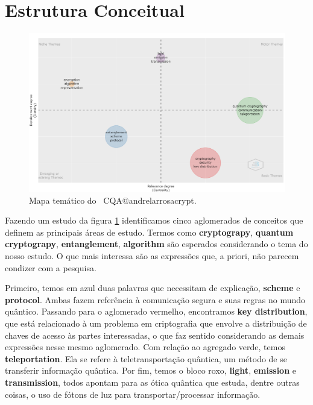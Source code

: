 \section{Estrutura Conceitual}

\begin{figure}
    \centering
    \includegraphics[angle=0,width=1\textwidth]{experiments/andrelarrosacrypt/AnaliseBibliometrica/CriptografiaQuantica/imagens/CQA@andrelarrosacrypt_MapaTematico.png}
    \caption{Mapa temático do \dataset\ CQA@andrelarrosacrypt.}
    \label{CQA@andrelarrosacrypt_MapaTematico}
\end{figure}

Fazendo um estudo da figura \ref{CQA@andrelarrosacrypt_MapaTematico} identificamos cinco aglomerados de conceitos que definem as principais áreas de estudo. Termos como \textbf{cryptograpy}, \textbf{quantum cryptograpy}, \textbf{entanglement}, \textbf{algorithm}  são esperados considerando o tema do nosso estudo. O que mais interessa são as expressões que, a priori, não parecem condizer com a pesquisa.

Primeiro, temos em azul duas palavras que necessitam de explicação, \textbf{scheme} e \textbf{protocol}. Ambas fazem referência à comunicação segura e suas regras no mundo quântico. Passando para o aglomerado vermelho, encontramos \textbf{key distribution}, que está relacionado à um problema em criptografia que envolve a distribuição de chaves de acesso às partes interessadas, o que faz sentido considerando as demais expressões nesse mesmo aglomerado. Com relação ao agregado verde, temos \textbf{teleportation}. Ela se refere à teletransportação quântica, um método de se transferir informação quântica. Por fim, temos o bloco roxo, \textbf{light}, \textbf{emission} e \textbf{transmission}, todos apontam para as ótica quântica que estuda, dentre outras coisas, o uso de fótons de luz para transportar/processar informação.

